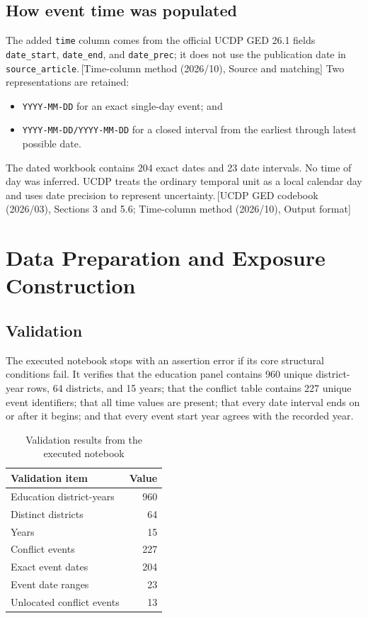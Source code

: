 \documentclass[11pt]{article}
\newcommand{\sourceref}[1]{\textcolor{black!65}{\,[#1]}}
\begin{document}
\subsection{How event time was populated}

The added \texttt{time} column comes from the official UCDP GED 26.1 fields \texttt{date\_start}, \texttt{date\_end}, and \texttt{date\_prec}; it does not use the publication date in \texttt{source\_article}.\sourceref{Time-column method (2026/10), Source and matching} Two representations are retained:

\begin{itemize}
  \item \texttt{YYYY-MM-DD} for an exact single-day event; and
  \item \texttt{YYYY-MM-DD/YYYY-MM-DD} for a closed interval from the earliest through latest possible date.
\end{itemize}

The dated workbook contains 204 exact dates and 23 date intervals. No time of day was inferred. UCDP treats the ordinary temporal unit as a local calendar day and uses date precision to represent uncertainty.\sourceref{UCDP GED codebook (2026/03), Sections 3 and 5.6; Time-column method (2026/10), Output format}

\section{Data Preparation and Exposure Construction}

\subsection{Validation}

The executed notebook stops with an assertion error if its core structural conditions fail. It verifies that the education panel contains 960 unique district-year rows, 64 districts, and 15 years; that the conflict table contains 227 unique event identifiers; that all time values are present; that every date interval ends on or after it begins; and that every event start year agrees with the recorded year.

\begin{table}[H]
\centering
\caption{Validation results from the executed notebook}
\label{tab:validation}
\begin{tabular}{lr}
\toprule
\textbf{Validation item} & \textbf{Value} \\
\midrule
Education district-years & 960 \\
Distinct districts & 64 \\
Years & 15 \\
Conflict events & 227 \\
Exact event dates & 204 \\
Event date ranges & 23 \\
Unlocated conflict events & 13 \\
\bottomrule
\end{tabular}
\end{table}
\end{document}
